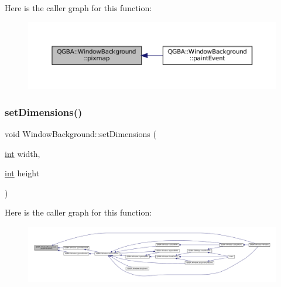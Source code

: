 Here is the caller graph for this function\+:
\nopagebreak
\begin{figure}[H]
\begin{center}
\leavevmode
\includegraphics[width=350pt]{class_q_g_b_a_1_1_window_background_a6d7ad776b592f3fde80b38238c582635_icgraph}
\end{center}
\end{figure}
\mbox{\label{class_q_g_b_a_1_1_window_background_a3e47a38bfb0c61fd412da8de97441789}} 
\subsubsection{\texorpdfstring{set\+Dimensions()}{setDimensions()}}
{\footnotesize\ttfamily void Window\+Background\+::set\+Dimensions (\begin{DoxyParamCaption}\item[{\mbox{\hyperlink{ioapi_8h_a787fa3cf048117ba7123753c1e74fcd6}{int}}}]{width,  }\item[{\mbox{\hyperlink{ioapi_8h_a787fa3cf048117ba7123753c1e74fcd6}{int}}}]{height }\end{DoxyParamCaption})}

Here is the caller graph for this function\+:
\nopagebreak
\begin{figure}[H]
\begin{center}
\leavevmode
\includegraphics[width=350pt]{class_q_g_b_a_1_1_window_background_a3e47a38bfb0c61fd412da8de97441789_icgraph}
\end{center}
\end{figure}
\mbox{\label{class_q_g_b_a_1_1_window_background_ae59914eea83da70457ef3a16cc954898}} 
